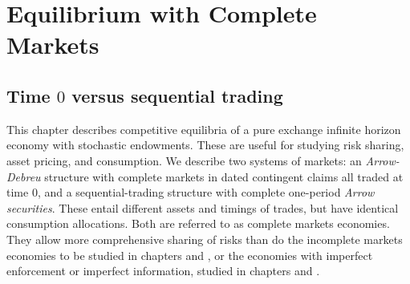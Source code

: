 
%


%


%


\chapter{Equilibrium with Complete Markets\label{recurge}}

\section{Time $0$ versus sequential trading}
 This chapter describes competitive   equilibria
of a pure exchange infinite horizon economy with stochastic
endowments.  These are  useful for studying risk sharing,
asset pricing, and consumption.       We describe two systems of markets:  an {\it Arrow-Debreu\/} structure with complete
markets in dated contingent claims all traded at time $0$,
%
 and a
sequential-trading structure with complete one-period {\it Arrow
securities\/}.
These  entail different assets  and timings of
trades, but have identical consumption allocations.
Both are referred to as complete markets
economies.  They allow more comprehensive sharing of risks
than do the incomplete markets economies to be
studied in chapters  and , or the economies
with imperfect enforcement or imperfect information, studied  in chapters
 and .




